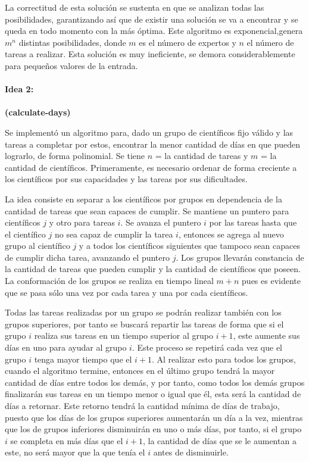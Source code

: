 \documentclass[10pt,letterpaper]{article}
\begin{document}
{ 	La correctitud de esta soluci\'on se sustenta en que se analizan todas las posibilidades, garantizando as\'i que de existir una soluci\'on se va a encontrar y se queda en todo momento con la m\'as \'optima. Este algoritmo es exponencial,genera $m^{n}$ distintas posibilidades, donde  $m$ es el n\'umero de expertos y $n$ el n\'umero de tareas a realizar. Esta soluci\'on es muy ineficiente, se demora considerablemente para peque\~nos valores de la entrada.\\ \\
 	
 	
 	{\Large \bf Idea 2:}\\ \\
 	{\small \bf (calculate-days)}
 	
 	Se implement\'o un algoritmo para, dado un grupo de cient\'ificos fijo v\'alido y las tareas a completar por estos, encontrar la menor cantidad de d\'ias en que pueden lograrlo, de forma polinomial. Se tiene $n$ = la cantidad de tareas y $m$ = la cantidad de cient\'ificos. Primeramente, es necesario ordenar de forma creciente a los cient\'ificos por sus capacidades y las tareas por sus dificultades.
 	
 	La idea consiste en separar a los cient\'ificos por grupos en dependencia de la cantidad de tareas que sean capaces de cumplir. Se mantiene un puntero para cient\'ificos $j$ y otro para tareas $i$. Se avanza el puntero $i$ por las tareas hasta que el cient\'ifico $j$ no sea capaz de cumplir la tarea $i$, entonces se agrega al nuevo grupo al cient\'ifico $j$ y a todos los cient\'ificos siguientes que tampoco sean capaces de cumplir dicha tarea, avanzando el puntero $j$. Los grupos llevar\'an constancia de la cantidad de tareas que pueden cumplir y la cantidad de cient\'ificos que poseen. La conformaci\'on de los grupos se realiza en tiempo lineal $m + n$ pues es evidente que se pasa s\'olo una vez por cada tarea y una por cada cient\'ificos.
 	
 	Todas las tareas realizadas por un grupo se podr\'an realizar tambi\'en con los grupos superiores, por tanto se buscar\'a repartir las tareas de forma que si el grupo $i$ realiza sus tareas en un tiempo superior al grupo $i + 1$, este aumente sus d\'ias en uno para ayudar al grupo $i$. Este proceso se repetir\'a cada vez que el grupo $i$ tenga mayor tiempo que el $i + 1$. Al realizar esto para todos los grupos, cuando el algoritmo termine, entonces en el \'ultimo grupo tendr\'a la mayor cantidad de d\'ias entre todos los dem\'as, y por tanto, como todos los dem\'as grupos finalizar\'an sus tareas en un tiempo menor o igual que \'el, esta ser\'a la cantidad de d\'ias a retornar. Este retorno tendr\'a la cantidad m\'inima de d\'ias de trabajo, puesto que los d\'ias de los grupos superiores aumentar\'an un d\'ia a la vez, mientras que los de grupos inferiores disminuir\'an en uno o m\'as d\'ias, por tanto, si el grupo $i$ se completa en m\'as d\'ias que el $i + 1$, la cantidad de d\'ias que se le aumentan a este, no ser\'a mayor que la que ten\'ia el $i$ antes de disminuirle.
 	
}
\end{document}
